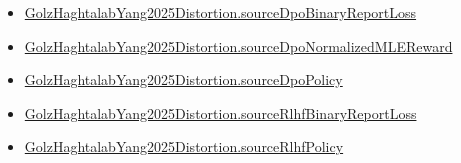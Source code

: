 \documentclass[10pt]{article}
\begin{document}
\begin{itemize}
\item \hyperlink{governing-declaration-0f2c5b70a888d5b3}{Golz\allowbreak{}Haghtalab\allowbreak{}Yang2025\allowbreak{}Distortion.\allowbreak{}source\allowbreak{}Dpo\allowbreak{}Binary\allowbreak{}Report\allowbreak{}Loss}
\item \hyperlink{governing-declaration-d547690922524bc2}{Golz\allowbreak{}Haghtalab\allowbreak{}Yang2025\allowbreak{}Distortion.\allowbreak{}source\allowbreak{}Dpo\allowbreak{}Normalized\allowbreak{}MLE\allowbreak{}Reward}
\item \hyperlink{governing-declaration-7f6992add20edc0b}{Golz\allowbreak{}Haghtalab\allowbreak{}Yang2025\allowbreak{}Distortion.\allowbreak{}source\allowbreak{}Dpo\allowbreak{}Policy}
\item \hyperlink{governing-declaration-9dc701ec2b5767ff}{Golz\allowbreak{}Haghtalab\allowbreak{}Yang2025\allowbreak{}Distortion.\allowbreak{}source\allowbreak{}Rlhf\allowbreak{}Binary\allowbreak{}Report\allowbreak{}Loss}
\item \hyperlink{governing-declaration-55b65ae526406849}{Golz\allowbreak{}Haghtalab\allowbreak{}Yang2025\allowbreak{}Distortion.\allowbreak{}source\allowbreak{}Rlhf\allowbreak{}Policy}
\end{itemize}
\end{document}
